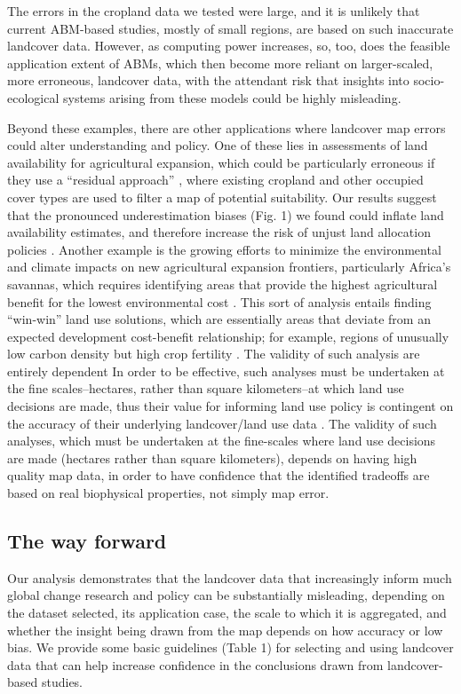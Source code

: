 \documentclass{pnastwo}
\begin{document}
\begin{article}
The errors in the cropland data we tested were large, and it is unlikely that current ABM-based studies, mostly of small regions, are based on such inaccurate landcover data. However, as computing power increases, so, too, does the feasible application extent of ABMs, which then become more reliant on larger-scaled, more erroneous, landcover data, with the attendant risk that insights into socio-ecological systems arising from these models could be highly misleading.  

Beyond these examples, there are other applications where landcover map errors could alter understanding and policy. One of these lies in assessments of land availability for agricultural expansion, which could be particularly erroneous if they use a ``residual approach'' \cite{lambin_estimating_????}, where existing cropland and other occupied cover types are used to filter a map of potential suitability. Our results suggest that the pronounced underestimation biases (Fig. 1) we found could inflate land availability estimates, and therefore increase the risk of unjust land allocation policies \cite{rulli_global_2013}. Another example is the growing efforts to minimize the environmental and climate impacts on new agricultural expansion frontiers, particularly Africa's savannas, which requires identifying areas that provide the highest agricultural benefit for the lowest environmental cost \cite{searchinger_high_2015}. This sort of analysis entails finding ``win-win'' land use solutions, which are essentially areas that deviate from an expected development cost-benefit relationship; for example, regions of unusually low carbon density but high crop fertility \cite{searchinger_high_2015}. The validity of such analysis are entirely dependent In order to be effective, such analyses must be undertaken at the fine scales--hectares, rather than square kilometers--at which land use decisions are made, thus their value for informing land use policy is contingent on the accuracy of their underlying landcover/land use data \cite{searchinger_high_2015}. The validity of such analyses, which must be undertaken at the fine-scales where land use decisions are made (hectares rather than square kilometers), depends on having high quality map data, in order to have confidence that the identified tradeoffs are based on real biophysical properties, not simply map error.

\subsection{The way forward}
Our analysis demonstrates that the landcover data that increasingly inform much global change research and policy can be substantially misleading, depending on the dataset selected, its application case, the scale to which it is aggregated, and whether the insight being drawn from the map depends on how accuracy or low bias. We provide some basic guidelines (Table 1) for selecting and using landcover data that can help increase confidence in the conclusions drawn from landcover-based studies. 


\end{article}
\end{document}
